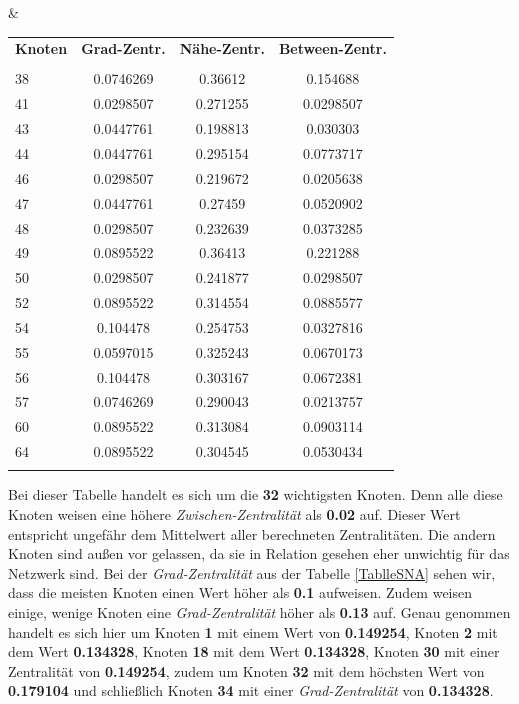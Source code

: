 \begin{table}[h!]
\begin{tabular}{lcccc}
  \\\bottomrule
 \end{tabular}
  &
\begin{tabular}{lccc}
\toprule 
\textbf{Knoten} &\textbf{Grad-Zentr.} &\textbf{Nähe-Zentr.}  &\textbf{Between-Zentr.}\\
   &\\\midrule
 38 & 0.0746269 & 0.36612  & 0.154688    \\
 41 & 0.0298507 & 0.271255 & 0.0298507   \\
 43 & 0.0447761 & 0.198813 & 0.030303    \\
 44 & 0.0447761 & 0.295154 & 0.0773717   \\
 46 & 0.0298507 & 0.219672 & 0.0205638   \\
 47 & 0.0447761 & 0.27459  & 0.0520902   \\
 48 & 0.0298507 & 0.232639 & 0.0373285   \\
 49 & 0.0895522 & 0.36413  & 0.221288    \\
 50 & 0.0298507 & 0.241877 & 0.0298507   \\
 52 & 0.0895522 & 0.314554 & 0.0885577   \\
 54 & 0.104478  & 0.254753 & 0.0327816   \\
 55 & 0.0597015 & 0.325243 & 0.0670173   \\
 56 & 0.104478  & 0.303167 & 0.0672381   \\
 57 & 0.0746269 & 0.290043 & 0.0213757   \\
 60 & 0.0895522 & 0.313084 & 0.0903114   \\
 64 & 0.0895522 & 0.304545 & 0.0530434   \\
      \\\bottomrule
\end{tabular}
\end{table}
\label{TablleSNA}

\FloatBarrier
Bei dieser Tabelle handelt es sich um die \textbf{32} wichtigsten Knoten. Denn alle diese Knoten weisen eine höhere \textit{Zwischen-Zentralität} als \textbf{0.02} auf. Dieser Wert entspricht ungefähr dem Mittelwert aller berechneten Zentralitäten. Die andern Knoten sind außen vor gelassen, da sie in Relation gesehen eher unwichtig für das Netzwerk sind.
Bei der \textit{Grad-Zentralität} aus der Tabelle \ref{TablleSNA} sehen wir, dass die meisten Knoten einen Wert höher als \textbf{0.1} aufweisen. Zudem weisen einige, wenige Knoten eine \textit{Grad-Zentralität} höher als \textbf{0.13} auf. Genau genommen handelt es sich hier um Knoten \textbf{1} mit einem Wert von \textbf{0.149254}, Knoten \textbf{2} mit dem Wert \textbf{0.134328}, Knoten \textbf{18} mit dem Wert \textbf{0.134328}, Knoten \textbf{30} mit einer Zentralität von \textbf{0.149254}, zudem um Knoten \textbf{32} mit dem höchsten Wert von \textbf{0.179104} und schließlich Knoten \textbf{34} mit einer \textit{Grad-Zentralität} von \textbf{0.134328}. \\

